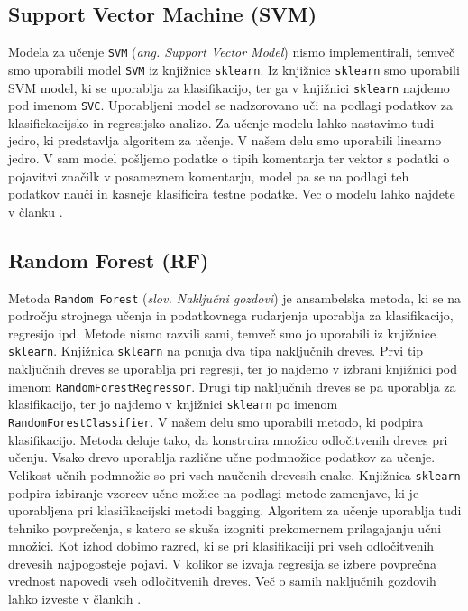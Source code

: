 \documentclass{acm_proc_article-sp}
\begin{document}
\subsection{Support Vector Machine (SVM)}
Modela za učenje {\tt SVM} ({\it ang. Support Vector Model}) nismo implementirali, temveč smo uporabili model {\tt SVM} iz knjižnice {\tt sklearn}.
Iz knjižnice {\tt sklearn} smo uporabili SVM model, ki se uporablja za klasifikacijo, ter ga v knjižnici {\tt sklearn} najdemo pod imenom {\tt SVC}.
Uporabljeni model se nadzorovano uči na podlagi podatkov za klasifickacijsko in regresijsko analizo.
Za učenje modelu lahko nastavimo tudi jedro, ki predstavlja algoritem za učenje.
V našem delu smo uporabili linearno jedro.
V sam model pošljemo podatke o tipih komentarja ter vektor s podatki o pojavitvi značilk v posameznem komentarju, model pa se na podlagi teh podatkov nauči in kasneje klasificira testne podatke.
Vec o modelu lahko najdete v članku \cite{Cortes1995}.

\subsection{Random Forest (RF)}
Metoda {\tt Random Forest} ({\it slov. Naključni gozdovi}) je ansambelska metoda, ki se na področju strojnega učenja in podatkovnega rudarjenja uporablja za klasifikacijo, regresijo ipd.
Metode nismo razvili sami, temveč smo jo uporabili iz knjižnice {\tt sklearn}.
Knjižnica {\tt sklearn} na ponuja dva tipa naključnih dreves.
Prvi tip naključnih dreves se uporablja pri regresji, ter jo najdemo v izbrani knjižnici pod imenom {\tt RandomForestRegressor}.
Drugi tip naključnih dreves se pa uporablja za klasifikacijo, ter jo najdemo v knjižnici {\tt sklearn} po imenom {\tt RandomForestClassifier}.
V našem delu smo uporabili metodo, ki podpira klasifikacijo.
Metoda deluje tako, da konstruira množico odločitvenih dreves pri učenju.
Vsako drevo uporablja različne učne podmnožice podatkov za učenje. Velikost učnih podmnožic so pri vseh naučenih drevesih enake.
Knjižnica {\tt sklearn} podpira izbiranje vzorcev učne možice na podlagi metode zamenjave, ki je uporabljena pri klasifikacijski metodi bagging.
Algoritem za učenje uporablja tudi tehniko povprečenja, s katero se skuša izogniti prekomernem prilagajanju učni množici.
Kot izhod dobimo razred, ki se pri klasifikaciji pri vseh odločitvenih drevesih najpogosteje pojavi.
V kolikor se izvaja regresija se izbere povprečna vrednost napovedi vseh odločitvenih dreves.
Več o samih naključnih gozdovih lahko izveste v člankih \cite{ho1998random, ho1995random}.
\end{document}
